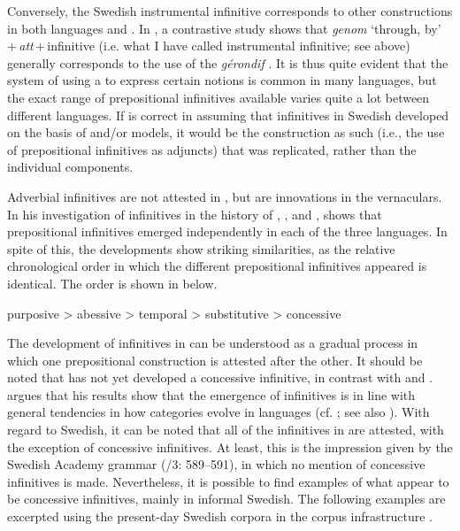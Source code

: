 \documentclass[output=paper]{langscibook}
\begin{document}
Conversely, the Swedish instrumental infinitive corresponds to other constructions in both  languages and . In , a contrastive study shows that \textit{genom} ‘through, by’\,+\,\textit{att}\,+\,infinitive (i.e. what I have called instrumental infinitive; see  above) generally corresponds to the use of the \textit{gérondif} \citep[128]{Hellqvist2015}. It is thus quite evident that the system of using a  to express certain  notions is common in many languages, but the exact range of prepositional infinitives available varies quite a lot between different languages. If \citet{Holm1967} is correct in assuming that  infinitives in Swedish developed on the basis of  and/or  models, it would be the construction as such (i.e., the use of prepositional infinitives as  adjuncts) that was replicated, rather than the individual components. 



Adverbial infinitives are not attested in , but are innovations in the vernaculars. In his investigation of  infinitives in the history of , , and , \citet{Schulte2007Prepositional,Schulte2007What} shows that prepositional infinitives emerged independently in each of the three languages. In spite of this, the developments show striking similarities, as the relative chronological order in which the different prepositional infinitives appeared is identical. The order is shown in  below. 


\ea \label{ex:kalm:6}
purposive > abessive > temporal > substitutive > concessive
\z

The development of  infinitives in  can be understood as a gradual process in which one prepositional construction is attested after the other. It should be noted that  has not yet developed a concessive infinitive, in contrast with  and . \citet{Schulte2007Prepositional} argues that his results show that the emergence of  infinitives is in line with general tendencies in how  categories evolve in languages (cf. \citealt{Cristofaro2005}; see also ). With regard to Swedish, it can be noted that all of the  infinitives in  are attested, with the exception of concessive infinitives. At least, this is the impression given by the Swedish Academy grammar (\citealt{TelemanEtAl1999}/3: 589–591), in which no mention of concessive infinitives is made. Nevertheless, it is possible to find examples of what appear to be concessive infinitives, mainly in informal Swedish. The following examples are excerpted using the present-day Swedish corpora in the corpus infrastructure  \citep{BorinEtAl2012}. 
\end{document}
